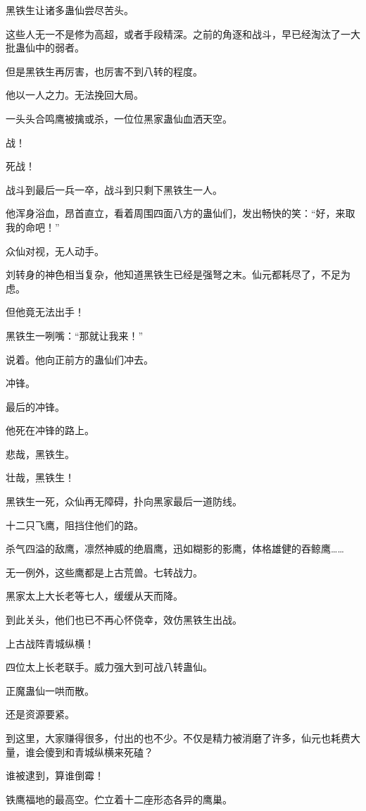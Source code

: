 \begin{this_body}
黑铁生让诸多蛊仙尝尽苦头。

这些人无一不是修为高超，或者手段精深。之前的角逐和战斗，早已经淘汰了一大批蛊仙中的弱者。

但是黑铁生再厉害，也厉害不到八转的程度。

他以一人之力。无法挽回大局。

一头头合鸣鹰被擒或杀，一位位黑家蛊仙血洒天空。

战！

死战！

战斗到最后一兵一卒，战斗到只剩下黑铁生一人。

他浑身浴血，昂首直立，看着周围四面八方的蛊仙们，发出畅快的笑：“好，来取我的命吧！”

众仙对视，无人动手。

刘转身的神色相当复杂，他知道黑铁生已经是强弩之末。仙元都耗尽了，不足为虑。

但他竟无法出手！

黑铁生一咧嘴：“那就让我来！”

说着。他向正前方的蛊仙们冲去。

冲锋。

最后的冲锋。

他死在冲锋的路上。

悲哉，黑铁生。

壮哉，黑铁生！

黑铁生一死，众仙再无障碍，扑向黑家最后一道防线。

十二只飞鹰，阻挡住他们的路。

杀气四溢的敌鹰，凛然神威的绝眉鹰，迅如糊影的影鹰，体格雄健的吞鲸鹰……

无一例外，这些鹰都是上古荒兽。七转战力。

黑家太上大长老等七人，缓缓从天而降。

到此关头，他们也已不再心怀侥幸，效仿黑铁生出战。

上古战阵青城纵横！

四位太上长老联手。威力强大到可战八转蛊仙。

正魔蛊仙一哄而散。

还是资源要紧。

到这里，大家赚得很多，付出的也不少。不仅是精力被消磨了许多，仙元也耗费大量，谁会傻到和青城纵横来死磕？

谁被逮到，算谁倒霉！

铁鹰福地的最高空。伫立着十二座形态各异的鹰巢。


\end{this_body}
